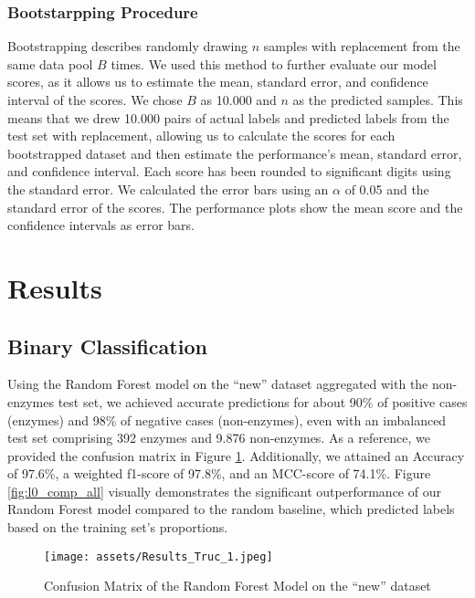 \documentclass{bioinfo}
\begin{document}
\begin{methods}
\subsubsection{Bootstarpping Procedure}
Bootstrapping describes randomly drawing $n$ samples with replacement from the same data pool $B$ times.
We used this method to further evaluate our model scores, as it allows us to estimate the mean, standard error, and confidence interval of the scores.
We chose $B$ as 10.000 and $n$ as the predicted samples.
This means that we drew 10.000 pairs of actual labels and predicted labels from the test set with replacement,
allowing us to calculate the scores for each bootstrapped dataset and then estimate the performance's mean, 
standard error, and confidence interval.
Each score has been rounded to significant digits using the standard error.
We calculated the error bars using an $\alpha$ of 0.05 and the standard error of the scores.
The performance plots show the mean score and the confidence intervals as error bars.

\end{methods}

\section{Results}	

\subsection{Binary Classification}\label{sec:RF_level0}
Using the Random Forest model on the ``new'' dataset aggregated with the non-enzymes test set, we achieved accurate
predictions for about 90\% of positive cases (enzymes) and 98\% of negative
cases (non-enzymes), even with an imbalanced test set comprising 392
enzymes and 9.876 non-enzymes. As a reference, we provided the confusion
matrix in Figure \ref{fig:RF_conf_l0}.
Additionally, we attained an Accuracy of 97.6\%, a weighted f1-score of
97.8\%, and an MCC-score of 74.1\%. Figure \ref{fig:l0_comp_all} visually demonstrates the significant outperformance of our Random Forest model compared to the random baseline, which predicted labels based on the training set's proportions.

\begin{figure}[!hb]
\texttt{[image: assets/Results\_Truc\_1.jpeg]}
\caption{Confusion Matrix of the Random Forest Model on the “new” dataset}\label{fig:RF_conf_l0}
\end{figure}
\end{document}
